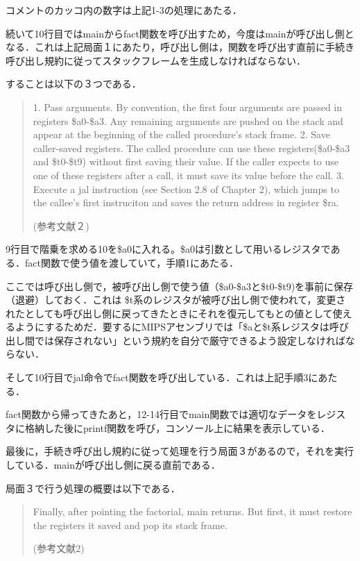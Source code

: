 \documentclass[a4j]{jarticle}
\begin{document}
コメントのカッコ内の数字は上記1-3の処理にあたる．

続いて10行目ではmainからfact関数を呼び出すため，今度はmainが呼び出し側となる．これは上記局面１にあたり，呼び出し側は，関数を呼び出す直前に手続き呼び出し規約に従ってスタックフレームを生成しなければならない．

することは以下の３つである．

\begin{quote}
1. Pass arguments. By convention, the first four arguments are passed in registers \$a0-\$a3. Any remaining arguments are pushed on the stack and appear at the beginning of the called procedure's stack frame.
2. Save caller-saved registers. The called procedure can use these registers(\$a0-\$a3 and \$t0-\$t9) without first saving their value. If the caller expects to use one of these registers after a call, it must save its value before the call.
3. Execute a jal instruction (see Section 2.8 of Chapter 2), which jumps to the callee's first instruciton and saves the return address in register \$ra.  

(参考文献２)
\end{quote}

9行目で階乗を求める10を\$a0に入れる。\$a0は引数として用いるレジスタである．fact関数で使う値を渡していて，手順1にあたる．

ここでは呼び出し側で，被呼び出し側で使う値（\$a0-\$a3と\$t0-\$t9)を事前に保存（退避）しておく．これは \$t系のレジスタが被呼び出し側で使われて，変更されたとしても呼び出し側に戻ってきたときにそれを復元してもとの値として使えるようにするためだ．要するにMIPSアセンブリでは「\$aと\$t系レジスタは呼び出し間では保存されない」という規約を自分で厳守できるよう設定しなければならない．

そして10行目でjal命令でfact関数を呼び出している．これは上記手順3にあたる．

fact関数から帰ってきたあと，12-14行目でmain関数では適切なデータをレジスタに格納した後にprintf関数を呼び，コンソール上に結果を表示している．

最後に，手続き呼び出し規約に従って処理を行う局面３があるので，それを実行している．mainが呼び出し側に戻る直前である．

局面３で行う処理の概要は以下である．


\begin{quote}
Finally, after pointing the factorial, main returns. But first, it must restore the registers it saved and pop its stack frame.

(参考文献2)
\end{quote}
\end{document}
